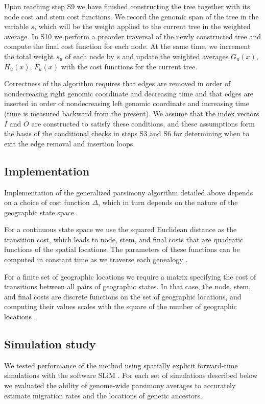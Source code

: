 Upon reaching step S9 we have finished constructing the tree together with its
node cost and stem cost functions. We record the genomic span of the tree in the 
variable $s$, which will be the weight applied to the current tree in the weighted
average. In S10 we perform a preorder traversal of the newly constructed tree
and compute the final cost function for each node. At the same time, we 
increment the total weight $s_u$ of each node by $s$ and update the weighted 
averages $G_u(x)$, $H_u(x)$, $F_u(x)$ with the cost functions for the current 
tree.

Correctness of the algorithm requires that edges are removed in order of 
nondecreasing right genomic coordinate and decreasing time and that edges are
inserted in order of nondecreasing left genomic coordinate and increasing time
(time is measured backward from the present). We assume that the index vectors
$I$ and $O$ are constructed to satisfy these conditions, and these assumptions 
form the basis of the conditional checks in steps S3 and S6 for determining
when to exit the edge removal and insertion loops.

\subsection{Implementation}

Implementation of the generalized parsimony algorithm detailed above depends on
a choice of cost function $\Delta$, which in turn depends on the nature of the
geographic state space.

For a continuous state space we use the squared Euclidean distance as the 
transition cost, which leads to node, stem, and final costs that are quadratic 
functions of the spatial locations. The parameters of these functions can be 
computed in constant time as we traverse each genealogy \cite{Maddison_1991}.

For a finite set of geographic locations we require a matrix specifying the 
cost of transitions between all pairs of geographic states. In that case, the
node, stem, and final costs are discrete functions on the set of geographic
locations, and computing their values scales with the square of the number of
geographic locations \cite{Clemente_etal_2009}.

\subsection{Simulation study}

We tested performance of the method using spatially explicit forward-time 
simulations with the software SLiM \cite{Haller_Messer_2019}. For each set of 
simulations described below we evaluated the ability of genome-wide parsimony 
averages to accurately estimate migration rates and the locations of genetic 
ancestors.


